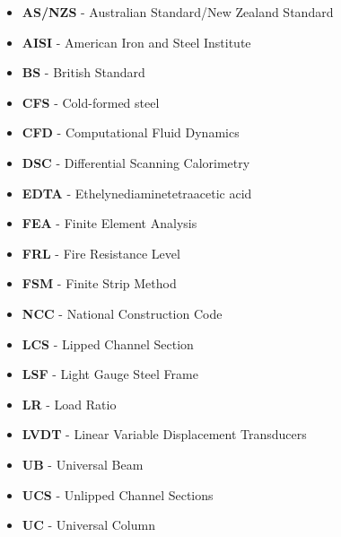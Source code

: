 \begin{itemize}[label={},leftmargin=*]
    \item \textbf{AS/NZS} - Australian Standard/New Zealand Standard
    \item \textbf{AISI} -  American Iron and Steel Institute
    \item \textbf{BS} -  British Standard
    \item \textbf{CFS} - Cold-formed steel
    \item \textbf{CFD} - Computational Fluid Dynamics
    \item \textbf{DSC} - Differential Scanning Calorimetry
    \item \textbf{EDTA} - Ethelynediaminetetraacetic acid
    \item \textbf{FEA} - Finite Element Analysis
    \item \textbf{FRL} -  Fire Resistance Level
    \item \textbf{FSM} - Finite Strip Method
    \item \textbf{NCC} -  National Construction Code
    \item \textbf{LCS} - Lipped Channel Section
    \item \textbf{LSF} - Light Gauge Steel Frame
    \item \textbf{LR} - Load Ratio
    \item \textbf{LVDT} - Linear Variable Displacement Transducers
    \item \textbf{UB} - Universal Beam
    \item \textbf{UCS} - Unlipped Channel Sections 
    \item \textbf{UC} - Universal Column
\end{itemize}